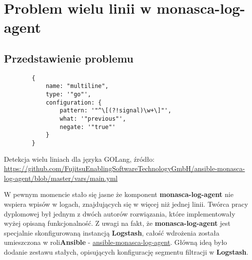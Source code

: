 \section{Problem wielu linii w monasca-log-agent}
\label{chapter:application_own:own_work:monasca_log_agent}

    \subsection{Przedstawienie problemu}
    \begin{listing}[h]
        \begin{verbatim}
        {
            name: "multiline",
            type: '"go"',
            configuration: {
                pattern: '"^\[(?!signal)\w+\]"',
                what: '"previous"',
                negate: '"true"'
            }
        }
        \end{verbatim}
        \caption[Detekcja wielu liniach dla języka GOLang]{
            Detekcja wielu liniach dla języka GOLang, źródło: \url{https://github.com/FujitsuEnablingSoftwareTechnologyGmbH/ansible-monasca-log-agent/blob/master/vars/main.yml}}
        \label{chapter:application_own:own_work:monasca_log_agent:filter_example}
    \end{listing}
    
    W pewnym momencie stało się jasne że komponent \textbf{monasca-log-agent} nie wspiera wpisów w logach, znajdujących się 
    w więcej niż jednej linii. Twórca pracy dyplomowej był jednym z dwóch autorów rozwiązania, które implementowały wyżej 
    opisaną funkcjonalność. Z uwagi na fakt, że \textbf{monasca-log-agent} jest specjalnie skonfigurowaną instancją 
    \textbf{Logstash}, całość wdrożenia została umieszczona w roli\textbf{Ansible} - 
    \href{https://github.com/FujitsuEnablingSoftwareTechnologyGmbH/ansible-monasca-log-agent}{ansible-monasca-log-agent}.
    Główną ideą było dodanie zestawu stałych, opisujących konfigurację segmentu filtracji w \textbf{Logstash}.

